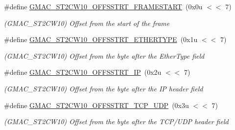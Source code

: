 \begin{DoxyCompactItemize}
\item 
\mbox{\label{group__SAME70__GMAC_gacea406e2cd17ddd6176a03a21330a7fd}} 
\#define \mbox{\hyperlink{group__SAME70__GMAC_gacea406e2cd17ddd6176a03a21330a7fd}{G\+M\+A\+C\+\_\+\+S\+T2\+C\+W10\+\_\+\+O\+F\+F\+S\+S\+T\+R\+T\+\_\+\+F\+R\+A\+M\+E\+S\+T\+A\+RT}}~(0x0u $<$$<$ 7)
\begin{DoxyCompactList}\small\item\em (G\+M\+A\+C\+\_\+\+S\+T2\+C\+W10) Offset from the start of the frame \end{DoxyCompactList}\item 
\mbox{\label{group__SAME70__GMAC_ga8618cf4caf24778aa490141670cb1c78}} 
\#define \mbox{\hyperlink{group__SAME70__GMAC_ga8618cf4caf24778aa490141670cb1c78}{G\+M\+A\+C\+\_\+\+S\+T2\+C\+W10\+\_\+\+O\+F\+F\+S\+S\+T\+R\+T\+\_\+\+E\+T\+H\+E\+R\+T\+Y\+PE}}~(0x1u $<$$<$ 7)
\begin{DoxyCompactList}\small\item\em (G\+M\+A\+C\+\_\+\+S\+T2\+C\+W10) Offset from the byte after the Ether\+Type field \end{DoxyCompactList}\item 
\mbox{\label{group__SAME70__GMAC_gac25177c6e329ffcc9a5a3b4b8ed6158b}} 
\#define \mbox{\hyperlink{group__SAME70__GMAC_gac25177c6e329ffcc9a5a3b4b8ed6158b}{G\+M\+A\+C\+\_\+\+S\+T2\+C\+W10\+\_\+\+O\+F\+F\+S\+S\+T\+R\+T\+\_\+\+IP}}~(0x2u $<$$<$ 7)
\begin{DoxyCompactList}\small\item\em (G\+M\+A\+C\+\_\+\+S\+T2\+C\+W10) Offset from the byte after the IP header field \end{DoxyCompactList}\item 
\mbox{\label{group__SAME70__GMAC_ga72684d2032380d00c3d79bac288970dd}} 
\#define \mbox{\hyperlink{group__SAME70__GMAC_ga72684d2032380d00c3d79bac288970dd}{G\+M\+A\+C\+\_\+\+S\+T2\+C\+W10\+\_\+\+O\+F\+F\+S\+S\+T\+R\+T\+\_\+\+T\+C\+P\+\_\+\+U\+DP}}~(0x3u $<$$<$ 7)
\begin{DoxyCompactList}\small\item\em (G\+M\+A\+C\+\_\+\+S\+T2\+C\+W10) Offset from the byte after the T\+C\+P/\+U\+DP header field \end{DoxyCompactList}\item 
\mbox{\label{group__SAME70__GMAC_ga3c04a5ea9bffca4232dbf11ec0e322ed}} 

\end{DoxyCompactItemize}
